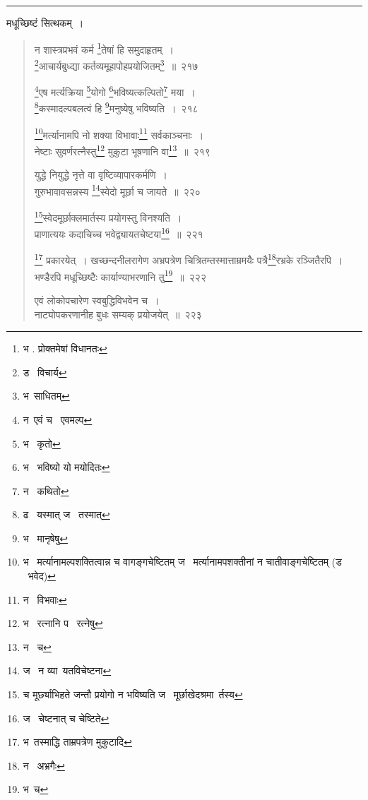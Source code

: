 \documentclass[11pt, openany]{book}
\begin{document}
\hrule

\vspace{2mm}
मधूच्छिष्टं सित्थकम्~।

\newpage

\begin{quote}
{\na न शास्त्रप्रभवं कर्म \renewcommand{\thefootnote}{1}\footnote{भ . प्रोक्तमेषां विधानतः}तेषां हि समुदाहृतम्~।\\
\renewcommand{\thefootnote}{2}\footnote{ड \textendash\ विचार्य }आचार्यबुध्द्या कर्तव्यमूहापोहप्रयोजितम्\renewcommand{\thefootnote}{3}\footnote{भ\textendash\ साधितम्}~॥~२१७

\renewcommand{\thefootnote}{4}\footnote{न\textendash\ एवं च \textendash\ एवमल्प }एष मर्त्यक्रिया \renewcommand{\thefootnote}{5}\footnote{भ \textendash\ कृतो }योगो \renewcommand{\thefootnote}{6}\footnote{भ \textendash\ भविष्यो यो मयोदितः}भविष्यत्कल्पितो\renewcommand{\thefootnote}{7}\footnote{न \textendash\ कथितो} मया~।\\
\renewcommand{\thefootnote}{8}\footnote{ढ \textendash\ यस्मात् ज \textendash\ तस्मात् }कस्मादल्पबलत्वं हि \renewcommand{\thefootnote}{9}\footnote{भ \textendash\ मानृषेषु}मनुष्येषु भविष्यति~।~२१८

\renewcommand{\thefootnote}{10}\footnote{भ \textendash\ मर्त्यानामल्पशक्तित्वान्न च वागङ्गचेष्टितम् ज \textendash\ मर्त्यानामपशक्तीनां न चातीवाङ्गचेष्टितम् (ड \textendash\ भवेद) }मर्त्यानामपि नो शक्या विभावाः\renewcommand{\thefootnote}{11}\footnote{न \textendash\ विभवाः} सर्वकाञ्चनाः~।\\
नेष्टाः सुवर्णरत्नैस्तु\renewcommand{\thefootnote}{12}\footnote{भ \textendash\ रत्नानि प \textendash\ रत्नेषु} मुकुटा भूषणानि वा\renewcommand{\thefootnote}{13}\footnote{न \textendash\ च}~॥~२१९

युद्धे नियुद्धे नृत्ते वा वृष्टिव्यापारकर्मणि~।\\
गुरुभावावसन्नस्य \renewcommand{\thefootnote}{14}\footnote{ज \textendash\ न व्या\textendash\ यतविचेष्टना }स्वेदो मूर्छा च जायते~॥~२२०

\renewcommand{\thefootnote}{15}\footnote{च मूर्छ्याभिहते जन्तौ प्रयोगो न भविष्यति ज \textendash\ मूर्छाखेदश्रमा\textendash\ र्तस्य}स्वेदमूर्छाक्लमार्तस्य प्रयोगस्तु विनश्यति~।\\
प्राणात्ययः कदाचिच्च भवेद्व्यायतचेष्टया\renewcommand{\thefootnote}{16}\footnote{ज \textendash\ चेष्टनात् च चेष्टिते }~॥~२२१

\renewcommand{\thefootnote}{17}\footnote{भ\textendash\ तस्माद्धि ताम्रपत्रेण मुकुटादि} प्रकारयेत्~। खच्छन्दनीलरागेण अभ्रपत्रेण चित्रितम्तस्मात्ताम्रमयैः पत्रै\renewcommand{\thefootnote}{18}\footnote{न \textendash\ अभ्रगैः}रभ्रके रञ्जितैरपि~।\\
भण्डैरपि मधूच्छिष्टैः कार्याण्याभरणानि तु\renewcommand{\thefootnote}{19}\footnote{भ\textendash\ च }~॥~२२२

एवं लोकोपचारेण स्वबुद्धिविभवेन च~।\\
नाट्योपकरणानीह बुधः सम्यक् प्रयोजयेत्~॥~२२३}
\end{quote}
\end{document}
